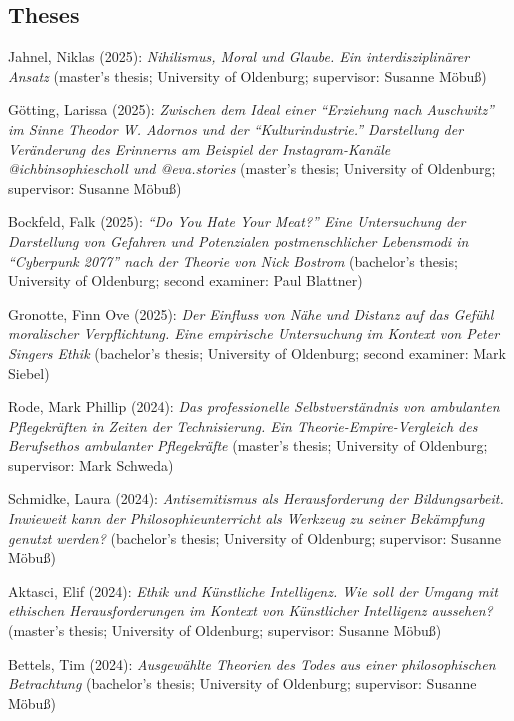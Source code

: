 \documentclass[a4paper,10pt]{article}
\newenvironment{literature}{%
   \parskip6pt\parindent0pt\raggedright
   \def\lititem{\hangindent=1cm\hangafter1}}{%
   \par\ignorespaces}
\begin{document}
\subsection*{Theses}
\begin{literature}
\lititem Jahnel, Niklas (2025): \textit{Nihilismus, Moral und Glaube. Ein interdisziplinärer Ansatz} (master's thesis; University of Oldenburg; supervisor: Susanne Möbuß)

\lititem Götting, Larissa (2025): \textit{Zwischen dem Ideal einer \enquote{Erziehung nach Auschwitz} im Sinne Theodor W. Adornos und der \enquote{Kulturindustrie.} Darstellung der Veränderung des Erinnerns am Beispiel der Instagram-Kanäle @ichbinsophiescholl und @eva.stories} (master's thesis; University of Oldenburg; supervisor: Susanne Möbuß)

\lititem Bockfeld, Falk (2025): \textit{\enquote{Do You Hate Your Meat?} Eine Untersuchung der Darstellung von Gefahren und Potenzialen postmenschlicher Lebensmodi in \enquote{Cyberpunk 2077} nach der Theorie von Nick Bostrom} (bachelor's thesis; University of Oldenburg; second examiner: Paul Blattner)

\lititem Gronotte, Finn Ove (2025): \textit{Der Einfluss von Nähe und Distanz auf das Gefühl moralischer Verpflichtung. Eine empirische Untersuchung im Kontext von Peter Singers Ethik} (bachelor's thesis; University of Oldenburg; second examiner: Mark Siebel)

\lititem Rode, Mark Phillip (2024): \textit{Das professionelle Selbstverständnis von ambulanten Pflegekräften in Zeiten der Technisierung. Ein Theorie-Empire-Vergleich des Berufsethos ambulanter Pflegekräfte} (master's thesis; University of Oldenburg; supervisor: Mark Schweda)

\lititem Schmidke, Laura (2024): \textit{Antisemitismus als Herausforderung der Bildungsarbeit. Inwieweit kann der Philosophieunterricht als Werkzeug zu seiner Bekämpfung genutzt werden?} (bachelor's thesis; University of Oldenburg; supervisor: Susanne Möbuß)

\lititem Aktasci, Elif (2024): \textit{Ethik und Künstliche Intelligenz. Wie soll der Umgang mit ethischen Herausforderungen im Kontext von Künstlicher Intelligenz aussehen?} (master's thesis; University of Oldenburg; supervisor: Susanne Möbuß)

\lititem Bettels, Tim (2024): \textit{Ausgewählte Theorien des Todes aus einer philosophischen Betrachtung} (bachelor's thesis; University of Oldenburg; supervisor: Susanne Möbuß)


\end{literature}
\end{document}

